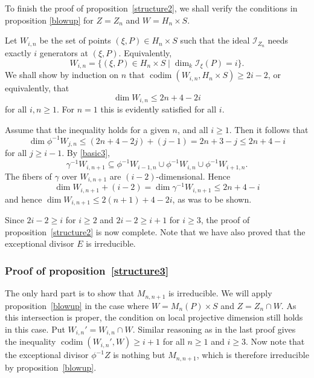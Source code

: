 \documentclass[12pt]{amsart}
\def\Hn{H_n}
\def\i{^{-1}}
\def\I{{\mathcal I}}
\def\x{\times}
\def\sub{\subseteq}
\def\codim{\operatorname{codim}}
\theoremstyle{definition}
\theoremstyle{remark}
\numberwithin{equation}{section}
\newcommand{\propref}[1]{proposition~\ref{#1}}
\begin{document}
To finish the proof of \propref{structure2},
we shall verify the conditions in proposition \ref{blowup}
for $Z=Z_{n}$ and $W=\Hn\times S$.

Let $W_{i,n}$ be the set of points $(\xi,P)\in \Hn\times S$ such that
the ideal $\I_{Z_{n}}$ needs exactly $i$ generators at $(\xi,P)$.
Equivalently,
\begin{equation}
W_{i,n}=\{(\xi,P)\in \Hn\x S \mid \dim_k\I_{\xi}(P) = i\}.
\end{equation}
We shall show by induction on $n$
that $\codim(W_{i,n},\Hn\x S) \ge 2i-2$, or
equivalently, that
\[
\dim W_{i,n}\le 2n+4-2i
\]
for all $i,n\ge1$. For $n=1$ this is evidently satisfied for all $i$.

Assume that the inequality holds for a given $n$, and all $i\ge1$.
Then it follows that
\[\dim\phi\i W_{j,n}\le (2n+4-2j) + (j-1) = 2n+3-j \le 2n+4-i\]
for all $j\ge i-1$. By \eqref{basic3},
\[\gamma\i W_{i,n+1}\sub
\phi\i W_{i-1,n}\cup\phi\i W_{i,n} \cup\phi\i W_{i+1,n}.
\]
The fibers of $\gamma$ over $W_{i,n+1}$ are $(i-2)$-dimensional. Hence
\[
\dim W_{i,n+1}+(i-2) = \dim \gamma\i W_{i,n+1}  \le 2n+4-i
\]
and hence $\dim W_{i,n+1}\le 2(n+1) +4 - 2i$, as was to be shown.

Since $2i-2\ge i$ for $i\ge2$ and $2i-2\ge i+1$ for $i\ge 3$, the
proof of \propref{structure2} is now complete. Note that we have also
proved that the exceptional divisor $E$ is irreducible.

\subsubsection*{Proof of \propref{structure3}} The only hard part is
to show that $M_{n,n+1}$ is irreducible.  We will apply
\propref{blowup} in the case where $W=M_{n}(P)\x S$ and $Z=Z_{n}\cap
W$.  As this intersection is proper, the condition on local projective
dimension still holds in this case.  Put $W_{i,n}'=W_{i,n}\cap W$.
Similar reasoning as in the last proof gives the inequality
$\codim(W_{i,n}',W)\ge i+1$ for all $n\ge 1$ and $i\ge 3$.
Now note that the exceptional divisor $\phi\i Z$ is nothing but
$M_{n,n+1}$, which is therefore irreducible by \propref{blowup}.
\end{document}
